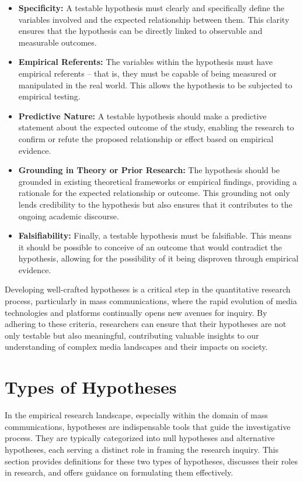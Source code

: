 \documentclass[
]{book}
\begin{document}
\begin{itemize}
\item
  \textbf{Specificity:} A testable hypothesis must clearly and specifically define the variables involved and the expected relationship between them. This clarity ensures that the hypothesis can be directly linked to observable and measurable outcomes.
\item
  \textbf{Empirical Referents:} The variables within the hypothesis must have empirical referents -- that is, they must be capable of being measured or manipulated in the real world. This allows the hypothesis to be subjected to empirical testing.
\item
  \textbf{Predictive Nature:} A testable hypothesis should make a predictive statement about the expected outcome of the study, enabling the research to confirm or refute the proposed relationship or effect based on empirical evidence.
\item
  \textbf{Grounding in Theory or Prior Research:} The hypothesis should be grounded in existing theoretical frameworks or empirical findings, providing a rationale for the expected relationship or outcome. This grounding not only lends credibility to the hypothesis but also ensures that it contributes to the ongoing academic discourse.
\item
  \textbf{Falsifiability:} Finally, a testable hypothesis must be falsifiable. This means it should be possible to conceive of an outcome that would contradict the hypothesis, allowing for the possibility of it being disproven through empirical evidence.
\end{itemize}

Developing well-crafted hypotheses is a critical step in the quantitative research process, particularly in mass communications, where the rapid evolution of media technologies and platforms continually opens new avenues for inquiry. By adhering to these criteria, researchers can ensure that their hypotheses are not only testable but also meaningful, contributing valuable insights to our understanding of complex media landscapes and their impacts on society.

\hypertarget{types-of-hypotheses}{%
\section{Types of Hypotheses}\label{types-of-hypotheses}}

In the empirical research landscape, especially within the domain of mass communications, hypotheses are indispensable tools that guide the investigative process. They are typically categorized into null hypotheses and alternative hypotheses, each serving a distinct role in framing the research inquiry. This section provides definitions for these two types of hypotheses, discusses their roles in research, and offers guidance on formulating them effectively.
\end{document}
